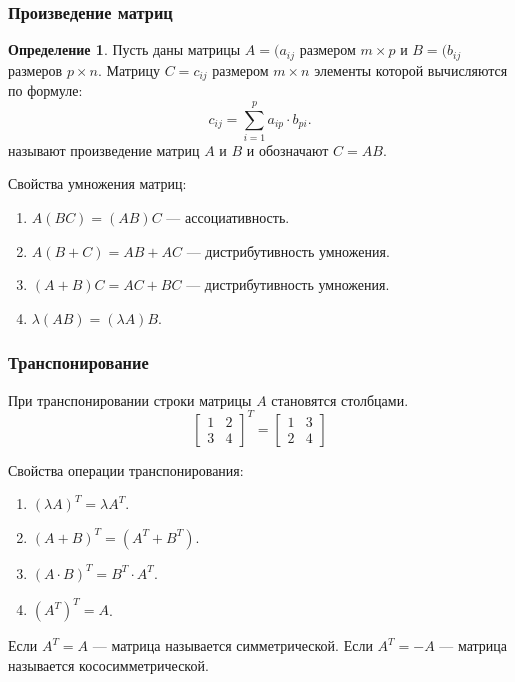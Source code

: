 \documentclass[12pt]{report}
\theoremstyle{definition}
\newtheorem{definition}[theorem]{Определение}
\begin{document}
\subsubsection{Произведение матриц}
\begin{definition}
Пусть даны матрицы $A = (a_{ij}$ размером $m\times p$ и $B = (b_{ij}$ размеров $p \times n$.
Матрицу $C = c_{ij}$ размером $m \times n$ элементы которой вычисляются по формуле:
$$
c_{ij} = \sum\limits_{i = 1}^p a_{ip} \cdot b_{pi}.
$$
называют произведение матриц $A$ и $B$ и обозначают $C = AB$.

Свойства умножения матриц:
\begin{enumerate}
\item $A(BC) = (AB)C$ --- ассоциативность.
\item $A(B + C) = AB + AC$ --- дистрибутивность умножения.
\item $(A + B) C = AC + BC$ --- дистрибутивность умножения.
\item $\lambda (AB) = (\lambda A) B$.
\end{enumerate}
\end{definition}

\subsubsection{Транспонирование}
При транспонировании строки матрицы $A$ становятся столбцами.
$$
\begin{bmatrix}
1 & 2  \\
3 & 4 
\end{bmatrix}^T
 = 
\begin{bmatrix}
1 & 3  \\
2 & 4 
\end{bmatrix}
$$

Свойства операции транспонирования:
\begin{enumerate}
\item $(\lambda A)^T = \lambda A^T$.
\item $(A + B)^T = (A^T + B^T)$.
\item $(A \cdot B)^T = B^T \cdot A^T$.
\item $(A^T)^T = A$.
\end{enumerate}

Если $A^T = A$ --- матрица называется симметрической.
Если $A^T = -A$ --- матрица называется кососимметрической.
\end{document}
